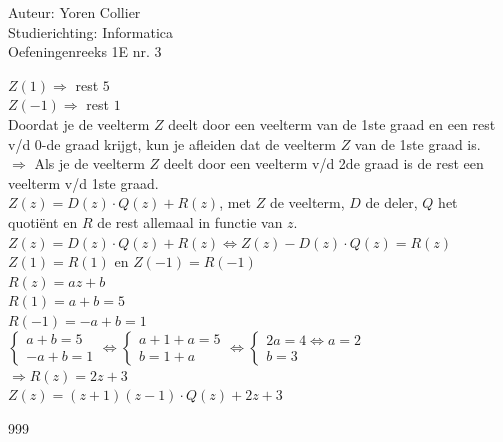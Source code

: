 \documentclass[a4paper]{article}
\newcommand{\asa}{\Leftrightarrow}
\newcommand{\adR}{\Rightarrow}
\begin{document}
\noindent \large Auteur: Yoren Collier \\
\noindent \large Studierichting: Informatica\\
\noindent \large Oefeningenreeks 1E nr. 3\\

\medskip

\normalsize

$Z(1) \adR$ rest $5$\\

$Z(-1) \adR$ rest $1$\\

Doordat je de veelterm $Z$ deelt door een veelterm van de 1ste graad en een rest v/d 0-de graad krijgt, kun je afleiden dat de veelterm $Z$ van de 1ste graad is.\\

$\adR$ Als je de veelterm $Z$ deelt door een veelterm v/d 2de graad is de rest een veelterm v/d 1ste graad.\\

$Z(z) = D(z)\cdot Q(z) + R(z)$, met $Z$ de veelterm, $D$ de deler, $Q$ het quotiënt en $R$ de rest allemaal in functie van $z$.\\

$Z(z) = D(z)\cdot Q(z) + R(z) \asa Z(z) - D(z)\cdot Q(z) = R(z)$\\

$Z(1) = R(1)$ en $Z(-1) = R(-1)$\\

$R(z) = az + b$\\

$R(1) = a + b = 5$\\

$R(-1) = -a + b = 1$\\

$\left \{
\begin{array}{l} %
a + b = 5 \\
-a + b = 1
\end{array}
\right .
\asa \left \{
\begin{array}{l}
a + 1 + a = 5\\
b = 1 + a
\end{array}
\right .
\asa \left \{
\begin{array}{l}
2a = 4 \asa a = 2\\
b = 3
\end{array}
\right .$\\

$\adR R(z) = 2z +3$\\

$Z(z) = (z + 1)(z - 1)\cdot Q(z) + 2z +3$


\begin{thebibliography}{999}
\end{thebibliography}
\end{document}
